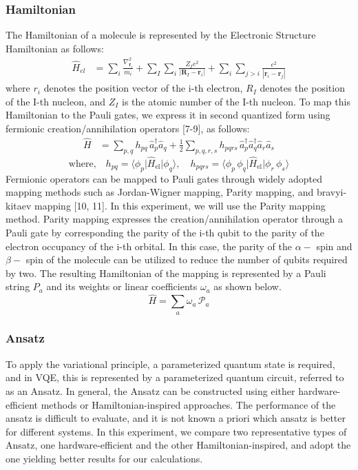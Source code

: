 \documentclass[pdflatex,sn-mathphys-num]{sn-jnl}%
\theoremstyle{thmstyleone}%
\theoremstyle{thmstyletwo}%
\theoremstyle{thmstylethree}%
\begin{document}
\subsubsection{Hamiltonian}\label{subsec2.2.1}
The Hamiltonian of a molecule is represented by the Electronic Structure Hamiltonian as follows:
\begin{align}
\hat{H}_{el} 
&= \sum_{i} \frac{\nabla_{\mathbf{r}_i}^2}{m_i}
+ \sum_{I} \sum_{i} \frac{Z_I e^2}{\left| \mathbf{R}_I - \mathbf{r}_i \right|}
+ \sum_{i} \sum_{j>i} \frac{e^2}{\left| \mathbf{r}_i - \mathbf{r}_j \right|}
\end{align}
where \(r_i\) denotes the position vector of the i-th electron, 
\(R_I\) denotes the position of the I-th nucleon, and \(Z_I\) is the atomic number of the I-th nucleon. 
To map this Hamiltonian to the Pauli gates, we express it in second quantized form using fermionic creation/annihilation operators [7-9], as follows:
\begin{align}
\hat{H} 
&= \sum_{p,q} h_{pq} \, \hat{a}_p^{\dagger} \hat{a}_q
+ \frac{1}{2} \sum_{p,q,r,s} h_{pqrs} \, \hat{a}_p^{\dagger} \hat{a}_q^{\dagger} \hat{a}_r \hat{a}_s
\end{align}
\begin{equation*}
\text{where,} \quad 
h_{pq} = \langle \phi_p \vert \hat{H}_{\mathrm{el}} \vert \phi_q \rangle, \quad
h_{pqrs} = \langle \phi_p \, \phi_q \vert \hat{H}_{\mathrm{el}} \vert \phi_r \, \phi_s \rangle
\end{equation*}
Fermionic operators can be mapped to Pauli gates through widely adopted mapping methods such as Jordan-Wigner mapping, Parity mapping, and bravyi-kitaev mapping [10, 11]. 
In this experiment, we will use the Parity mapping method. 
Parity mapping expresses the creation/annihilation operator through a Pauli gate by corresponding the parity of the i-th qubit to the parity of the electron occupancy of the i-th orbital. 
In this case, the parity of the \(\alpha-\) spin and \(\beta-\) spin of the molecule can be utilized to reduce the number of qubits required by two. 
The resulting Hamiltonian of the mapping is represented by a Pauli string \(P_a\) and its weights or linear coefficients \(\omega_a\) as shown below.
\begin{equation}
\hat{H} = \sum_{a} \omega_{a} \, \mathcal{P}_{a}
\end{equation}

\subsubsection{Ansatz}\label{subsec2.2.2}
To apply the variational principle, a parameterized quantum state is required, and in VQE, this is represented by a parameterized quantum circuit, 
referred to as an Ansatz. In general, the Ansatz can be constructed using either hardware-efficient methods or Hamiltonian-inspired approaches.
The performance of the ansatz is difficult to evaluate, and it is not known a priori which ansatz is better for different systems. 
In this experiment, we compare two representative types of Ansatz, one hardware-efficient and the other Hamiltonian-inspired, and adopt the one yielding better results for our calculations.
\end{document}
